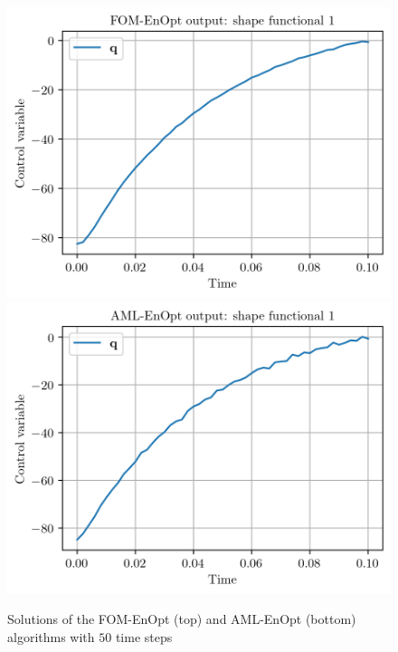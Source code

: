 \begin{figure}
\centering
\includegraphics{Plots/FOMSolutionNT50.png}
\includegraphics{Plots/ROMSolutionNT50.png}
\caption{\label{solutionsNT50}Solutions of the FOM-EnOpt (top) and AML-EnOpt (bottom) algorithms with $50$ time steps}
\end{figure}


